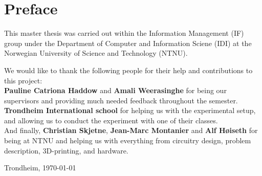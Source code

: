 \section*{Preface}
	\vspace{1cm}
	This master thesis was carried out within the Information Management (IF) 
	group under the Department of Computer and Information Sciene (IDI) 
	at the Norwegian University of Science and Technology (NTNU).
	
	\vspace{2cm}
	\noindent
	We would like to thank the following people for their help and contributions to this project:
	\\\noindent
	\textbf{Pauline Catriona Haddow} and \textbf{Amali Weerasinghe} for being our supervisors and providing much needed feedback throughout the semester. \\
	\textbf{Trondheim International school} for helping us with the experimental setup, and allowing us to conduct the experiment with one of their classes. \\
	And finally, \textbf{Christian Skjetne}, \textbf{Jean-Marc Montanier} and \textbf{Alf Høiseth} for being at NTNU and helping us with everything from circuitry design, problem description, 3D-printing, and hardware.
	
	
	\vfill
	
	\hfill \thesisAuthor
	
	\hfill Trondheim, \today
%	
%	
%	
